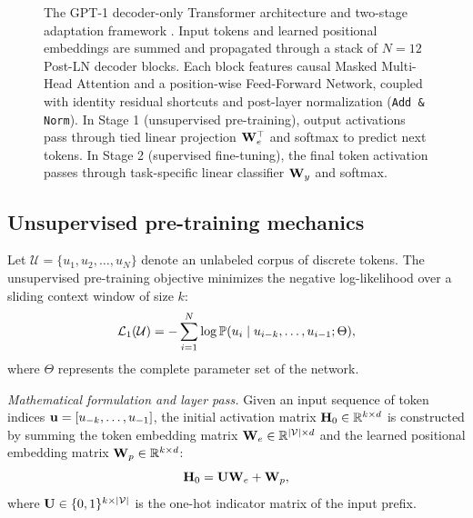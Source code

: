 \documentclass[../../main.tex]{subfiles}
\begin{document}
\begin{figure}[htbp]
{\begin{tikzpicture}
\end{tikzpicture}%
}
\caption{The GPT-1 decoder-only Transformer architecture and two-stage adaptation framework \cite{radford2018}. Input tokens and learned positional embeddings are summed and propagated through a stack of $N=12$ Post-LN decoder blocks. Each block features causal Masked Multi-Head Attention and a position-wise Feed-Forward Network, coupled with identity residual shortcuts and post-layer normalization (\texttt{Add \& Norm}). In Stage 1 (unsupervised pre-training), output activations pass through tied linear projection $\mathbf{W}_e^\top$ and softmax to predict next tokens. In Stage 2 (supervised fine-tuning), the final token activation passes through task-specific linear classifier $\mathbf{W}_y$ and softmax.}
\label{fig:gpt1_decoder_architecture}
\end{figure}

\subsection{Unsupervised pre-training mechanics}
\label{subsec:gpt1_pretraining_mechanics}

Let $\mathcal{U} = \{u_1, u_2, \dots, u_N\}$ denote an unlabeled corpus of discrete tokens. The unsupervised pre-training objective minimizes the negative log-likelihood over a sliding context window of size $k$:
\begin{equation}
\label{eq:gpt1_unsupervised_loss}
\mathcal{L}_1(\mathcal{U}) = -\sum_{i=1}^N \log \mathbb{P}(u_i \mid u_{i-k}, \dots, u_{i-1}; \Theta),
\end{equation}
where $\Theta$ represents the complete parameter set of the network.

\textit{Mathematical formulation and layer pass.}
Given an input sequence of token indices $\mathbf{u} = [u_{-k}, \dots, u_{-1}]$, the initial activation matrix $\mathbf{H}_0 \in \mathbb{R}^{k \times d}$ is constructed by summing the token embedding matrix $\mathbf{W}_e \in \mathbb{R}^{|\mathcal{V}| \times d}$ and the learned positional embedding matrix $\mathbf{W}_p \in \mathbb{R}^{k \times d}$:
\begin{equation}
\label{eq:gpt1_input_representation}
\mathbf{H}_0 = \mathbf{U} \mathbf{W}_e + \mathbf{W}_p,
\end{equation}
where $\mathbf{U} \in \{0, 1\}^{k \times |\mathcal{V}|}$ is the one-hot indicator matrix of the input prefix.
\end{document}
